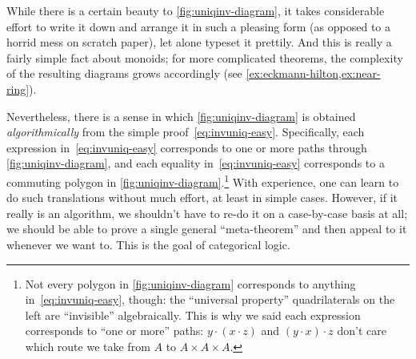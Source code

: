 While there is a certain beauty to \cref{fig:uniqinv-diagram}, it takes considerable effort to write it down and arrange it in such a pleasing form (as opposed to a horrid mess on scratch paper), let alone typeset it prettily.
And this is really a fairly simple fact about monoids; for more complicated theorems, the complexity of the resulting diagrams grows accordingly (see \cref{ex:eckmann-hilton,ex:near-ring}).

Nevertheless, there is a sense in which \cref{fig:uniqinv-diagram} is obtained \emph{algorithmically} from the simple proof~\eqref{eq:invuniq-easy}.
Specifically, each expression in~\eqref{eq:invuniq-easy} corresponds to one or more paths through \cref{fig:uniqinv-diagram}, and each equality in~\eqref{eq:invuniq-easy} corresponds to a commuting polygon in \cref{fig:uniqinv-diagram}.\footnote{Not every polygon in \cref{fig:uniqinv-diagram} corresponds to anything in~\eqref{eq:invuniq-easy}, though: the ``universal property'' quadrilaterals on the left are ``invisible'' algebraically.
  This is why we said each expression corresponds to ``one or more'' paths: $y\cdot (x\cdot z)$ and $(y\cdot x)\cdot z$ don't care which route we take from $A$ to $A\times A\times A$.}
With experience, one can learn to do such translations without much effort, at least in simple cases.
However, if it really is an algorithm, we shouldn't have to re-do it on a case-by-case basis at all; we should be able to prove a single general ``meta-theorem'' and then appeal to it whenever we want to.
This is the goal of categorical logic.


